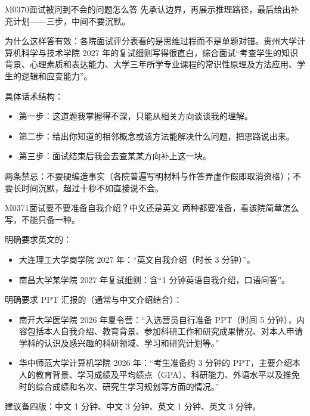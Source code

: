 \begin{qa}{M0370}{面试被问到不会的问题怎么答}
先承认边界，再展示推理路径，最后给出补充计划——三步，中间不要沉默。

为什么这样答有效：各院面试评分表看的是思维过程而不是单题对错。贵州大学计算机科学与技术学院 2027 年的复试细则写得很直白，综合面试“考查学生的知识背景、心理素质和表达能力、大学三年所学专业课程的常识性原理及方法应用、学生的逻辑和应变能力”。

具体话术结构：
\begin{itemize}
  \item 第一步：这道题我掌握得不深，只能从相关方向谈谈我的理解。
  \item 第二步：给出你知道的相邻概念或该方法能解决什么问题，把思路说出来。
  \item 第三步：面试结束后我会去查某某方向补上这一块。
\end{itemize}

两条禁忌：不要硬编造事实（各院普遍写明材料与作答弄虚作假即取消资格）；不要长时间沉默，超过十秒不如直接说不会。
\end{qa}

\begin{qa}{M0371}{面试要不要准备自我介绍？中文还是英文}
两种都要准备，看该院简章怎么写，不能只备一种。

明确要求英文的：
\begin{itemize}
  \item 大连理工大学商学院 2027 年：“英文自我介绍（时长 3 分钟）”。
  \item 南昌大学某学院 2027 年复试细则：含“1 分钟英语自我介绍，口语问答”。
\end{itemize}

明确要求 PPT 汇报的（通常与中文介绍结合）：
\begin{itemize}
  \item 南开大学医学院 2026 年夏令营：“入选营员自行准备 PPT（时间 5 分钟），内容包括本人自我介绍、教育背景、参加科研工作和研究成果情况、对本人申请学科的认识及感兴趣的科研领域、学习和研究计划等。”
  \item 华中师范大学计算机学院 2026 年：“考生准备约 3 分钟的 PPT，主要介绍本人的教育背景、学习成绩及平均绩点（GPA）、科研能力、外语水平以及推免时的综合成绩和名次、研究生学习规划等方面的情况。”
\end{itemize}

建议备四版：中文 1 分钟、中文 3 分钟、英文 1 分钟、英文 3 分钟。
\end{qa}


